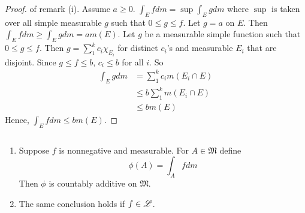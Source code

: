 \documentclass[11pt]{article}
\begin{document}
  \begin{proof} of remark (i). Assume $a \ge 0$. $\int_E f dm = \sup \int_E g dm$ where $\sup$ is taken over all simple measurable $g$ such that $0 \le g \le f$. Let $g = a$ on $E$. Then $\int_E f dm \ge \int_E g dm = a m(E)$. Let $g$ be a measurable simple function such that $0 \le g \le f$. Then $g = \sum_1^k c_i \chi_{E_i}$ for distinct $c_i$'s and measurable $E_i$ that are disjoint. Since $g \le f \le b$, $c_i \le b$ for all $i$. So \begin{align*} \int_E g dm & = \sum_1^k c_i m (E_i \cap E) \\ & \le b \sum_1^k m (E_i \cap E) \\ & \le b m(E) \end{align*}Hence, $\int_E f dm \le b m(E)$.
  \end{proof}

  \begin{theorem} $\text{}$
    \begin{enumerate}
    \item Suppose $f$ is nonnegative and measurable. For $A \in \mathfrak{M}$ define $$\phi(A) = \int_A f dm$$
      Then $\phi$ is countably additive on $\mathfrak{M}$.
    \item The same conclusion holds if $f \in \mathscr{L}$.
    \end{enumerate}
  \end{theorem}
\end{document}
